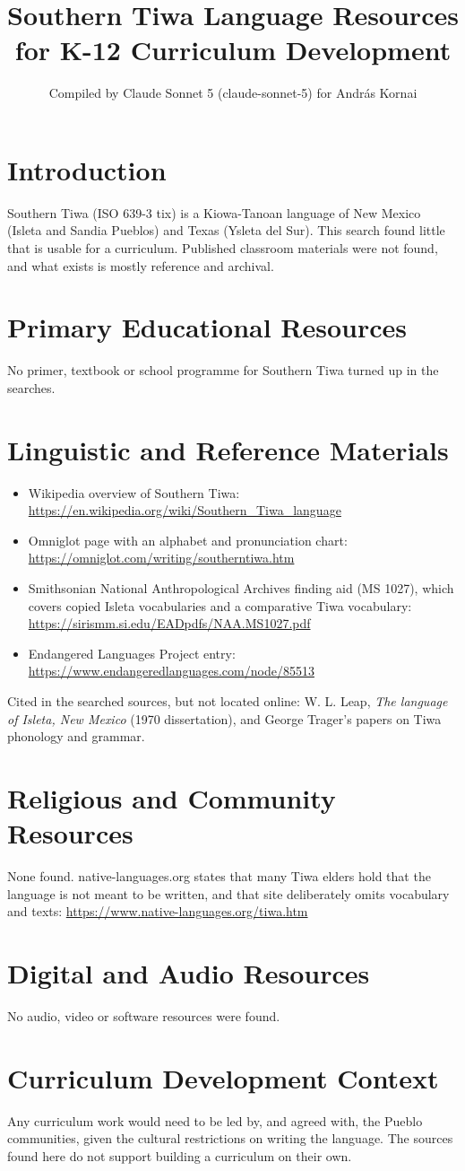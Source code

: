 \documentclass[12pt]{article}
\title{Southern Tiwa Language Resources for K-12 Curriculum Development}
\author{Compiled by Claude Sonnet 5 (claude-sonnet-5) for Andr\'as Kornai}
\date{}
\begin{document}
\maketitle
\section{Introduction}
Southern Tiwa (ISO 639-3 tix) is a Kiowa-Tanoan language of New Mexico (Isleta and Sandia Pueblos) and Texas (Ysleta del Sur). This search found little that is usable for a curriculum. Published classroom materials were not found, and what exists is mostly reference and archival.

\section{Primary Educational Resources}
No primer, textbook or school programme for Southern Tiwa turned up in the searches.

\section{Linguistic and Reference Materials}
\begin{itemize}
\item Wikipedia overview of Southern Tiwa: \url{https://en.wikipedia.org/wiki/Southern_Tiwa_language}
\item Omniglot page with an alphabet and pronunciation chart: \url{https://omniglot.com/writing/southerntiwa.htm}
\item Smithsonian National Anthropological Archives finding aid (MS 1027), which covers copied Isleta vocabularies and a comparative Tiwa vocabulary: \url{https://sirismm.si.edu/EADpdfs/NAA.MS1027.pdf}
\item Endangered Languages Project entry: \url{https://www.endangeredlanguages.com/node/85513}
\end{itemize}
Cited in the searched sources, but not located online: W. L. Leap, \emph{The language of Isleta, New Mexico} (1970 dissertation), and George Trager's papers on Tiwa phonology and grammar.

\section{Religious and Community Resources}
None found. native-languages.org states that many Tiwa elders hold that the language is not meant to be written, and that site deliberately omits vocabulary and texts: \url{https://www.native-languages.org/tiwa.htm}

\section{Digital and Audio Resources}
No audio, video or software resources were found.

\section{Curriculum Development Context}
Any curriculum work would need to be led by, and agreed with, the Pueblo communities, given the cultural restrictions on writing the language. The sources found here do not support building a curriculum on their own.
\end{document}
